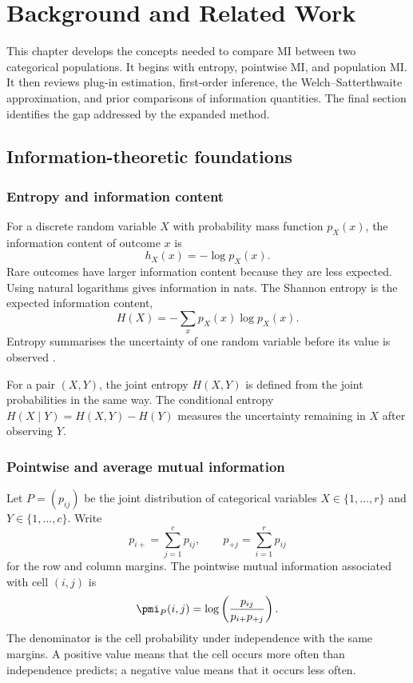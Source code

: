 \chapter{Background and Related Work}
\label{chap:background}

This chapter develops the concepts needed to compare MI between two
categorical populations. It begins with entropy, pointwise MI, and population
MI. It then reviews plug-in estimation, first-order inference, the
Welch--Satterthwaite approximation, and prior comparisons of information
quantities. The final section identifies the gap addressed by the expanded
method.

\section{Information-theoretic foundations}

\subsection{Entropy and information content}

For a discrete random variable \(X\) with probability mass function
\(p_X(x)\), the information content of outcome \(x\) is
\begin{equation}
  h_X(x)=-\log p_X(x).
\end{equation}
Rare outcomes have larger information content because they are less expected.
Using natural logarithms gives information in nats. The Shannon entropy is the
expected information content,
\begin{equation}
  H(X)=-\sum_x p_X(x)\log p_X(x).
  \label{eq:entropy}
\end{equation}
Entropy summarises the uncertainty of one random variable before its value is
observed \citep{shannon1948}.

For a pair \((X,Y)\), the joint entropy \(H(X,Y)\) is defined from the joint
probabilities in the same way. The conditional entropy
\(
H(X\mid Y)=H(X,Y)-H(Y)
\)
measures the uncertainty remaining in \(X\) after observing \(Y\).

\subsection{Pointwise and average mutual information}

Let \(P=(p_{ij})\) be the joint distribution of categorical variables
\(X\in\{1,\ldots,r\}\) and \(Y\in\{1,\ldots,c\}\). Write
\begin{equation}
  p_{i+}=\sum_{j=1}^{c}p_{ij},
  \qquad
  p_{+j}=\sum_{i=1}^{r}p_{ij}
\end{equation}
for the row and column margins. The pointwise mutual information associated
with cell \((i,j)\) is
\begin{equation}
  \pmi_P(i,j)
  =\log\left(\frac{p_{ij}}{p_{i+}p_{+j}}\right).
  \label{eq:background-pmi}
\end{equation}
The denominator is the cell probability under independence with the same
margins. A positive value means that the cell occurs more often than
independence predicts; a negative value means that it occurs less often.

